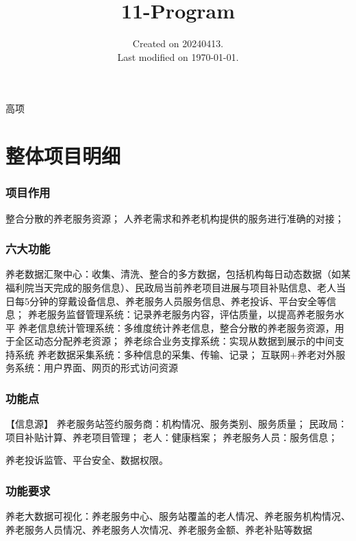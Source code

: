 \documentclass[UTF8]{../computerUniverse}
\begin{document}
\title{11-Program}
\date{Created on 20240413.\\   Last modified on \today.}
\maketitle
\tableofcontents


高项

\chapter{整体项目明细}

\subsection{项目作用}


整合分散的养老服务资源；
人养老需求和养老机构提供的服务进行准确的对接；

\subsection{六大功能}

养老数据汇聚中心：收集、清洗、整合的多方数据，包括机构每日动态数据（如某福利院当天完成的服务信息）、民政局当前养老项目进展与项目补贴信息、老人当日每5分钟的穿戴设备信息、养老服务人员服务信息、养老投诉、平台安全等信息；
养老服务监督管理系统：记录养老服务内容，评估质量，以提高养老服务水平
养老信息统计管理系统：多维度统计养老信息，整合分散的养老服务资源，用于全区动态分配养老资源；
养老综合业务支撑系统：实现从数据到展示的中间支持系统
养老数据采集系统：多种信息的采集、传输、记录；
互联网+养老对外服务系统：用户界面、网页的形式访问资源

\subsection{功能点}

【信息源】
养老服务站签约服务商：机构情况、服务类别、服务质量；
民政局：项目补贴计算、养老项目管理；
老人：健康档案；
养老服务人员：服务信息；

养老投诉监管、平台安全、数据权限。


\subsection{功能要求}

养老大数据可视化：养老服务中心、服务站覆盖的老人情况、养老服务机构情况、养老服务人员情况、养老服务人次情况、养老服务金额、养老补贴等数据
\end{document}

